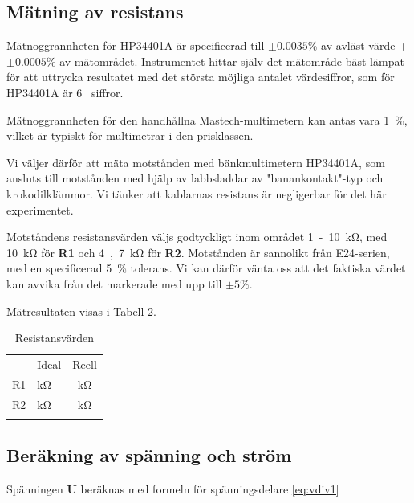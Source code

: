 \documentclass[11pt,a4paper]{article}
\begin{document}
\subsection{Mätning av resistans}\label{vdiv}
\par Mätnoggrannheten för HP34401A är specificerad till $\pm{}0.0035\%$ av
avläst värde + $\pm{}0.0005\%$ av mätområdet. Instrumentet hittar själv det
mätområde bäst lämpat för att uttrycka resultatet med det största möjliga antalet
värdesiffror, som för HP34401A är \si{6} siffror.
\par Mätnoggrannheten för den handhållna Mastech-multimetern kan antas vara
\si{1\%}, vilket är typiskt för multimetrar i den prisklassen.
\par Vi väljer därför att mäta motstånden med bänkmultimetern HP34401A, som ansluts
till motstånden med hjälp av labbsladdar av "banankontakt"-typ och krokodilklämmor.
Vi tänker att kablarnas resistans är negligerbar för det här experimentet.
\\
\par Motståndens resistansvärden väljs godtyckligt inom området \si{1-10\kohm}, 
med \si{10\kohm} för \textbf{R1} och \si{4,7\kohm} för \textbf{R2}.
Motstånden är sannolikt från E24-serien, med en specificerad \si{5\%} tolerans. Vi kan
därför vänta oss att det faktiska värdet kan avvika från det markerade med upp till
$\pm{}5\%$. 
\par Mätresultaten visas i Tabell \ref{restable}.

\begin{table}
    \begin{longtable}[c]{@{}llc@{}}
        \toprule\addlinespace
           & Ideal                  & Reell
        \\\addlinespace
        \midrule\endhead
        R1 & \unit[10]{\si{\kohm}}  & \unit[9,870]{\si{\kohm}}
        \\\addlinespace
        R2 & \unit[4,7]{\si{\kohm}} & \unit[4,677]{\si{\kohm}}
        \\\addlinespace
        \bottomrule
        \addlinespace
        \caption{Resistansvärden}
        \label{restable}
    \end{longtable}
\end{table}


\subsection{Beräkning av spänning och ström}\label{vdiv_multi}
Spänningen \textbf{U} beräknas med formeln för spänningsdelare \eqref{eq:vdiv1}
\end{document}
